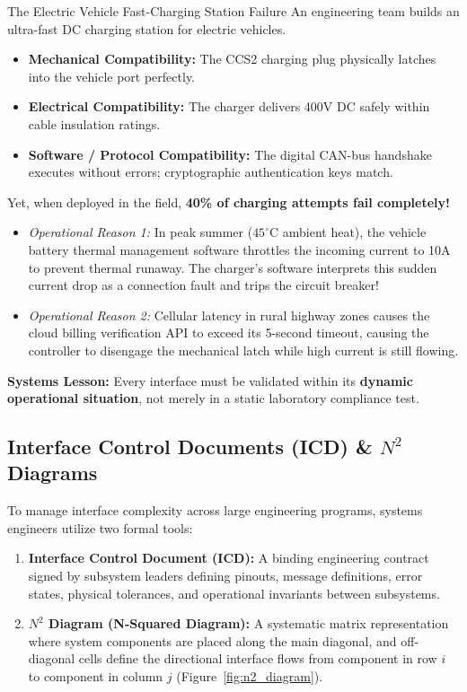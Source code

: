 \begin{examplebox}{The Electric Vehicle Fast-Charging Station Failure}
An engineering team builds an ultra-fast DC charging station for electric vehicles.
\begin{itemize}[leftmargin=1.5em]
    \item \textbf{Mechanical Compatibility:} The CCS2 charging plug physically latches into the vehicle port perfectly.
    \item \textbf{Electrical Compatibility:} The charger delivers 400V DC safely within cable insulation ratings.
    \item \textbf{Software / Protocol Compatibility:} The digital CAN-bus handshake executes without errors; cryptographic authentication keys match.
\end{itemize}
Yet, when deployed in the field, \textbf{40\% of charging attempts fail completely!}
\begin{itemize}[leftmargin=1.5em]
    \item \textit{Operational Reason 1:} In peak summer ($45^\circ\text{C}$ ambient heat), the vehicle battery thermal management software throttles the incoming current to 10A to prevent thermal runaway. The charger's software interprets this sudden current drop as a connection fault and trips the circuit breaker!
    \item \textit{Operational Reason 2:} Cellular latency in rural highway zones causes the cloud billing verification API to exceed its 5-second timeout, causing the controller to disengage the mechanical latch while high current is still flowing.
\end{itemize}
\textbf{Systems Lesson:} Every interface must be validated within its \textbf{dynamic operational situation}, not merely in a static laboratory compliance test.
\end{examplebox}

\subsection{Interface Control Documents (ICD) \& \texorpdfstring{$N^2$}{N-Squared} Diagrams}
To manage interface complexity across large engineering programs, systems engineers utilize two formal tools:
\begin{enumerate}[leftmargin=2em]
    \item \textbf{Interface Control Document (ICD):} A binding engineering contract signed by subsystem leaders defining pinouts, message definitions, error states, physical tolerances, and operational invariants between subsystems.
    \item \textbf{$N^2$ Diagram (N-Squared Diagram):} A systematic matrix representation where system components are placed along the main diagonal, and off-diagonal cells define the directional interface flows from component in row $i$ to component in column $j$ (Figure~\ref{fig:n2_diagram}).
\end{enumerate}

